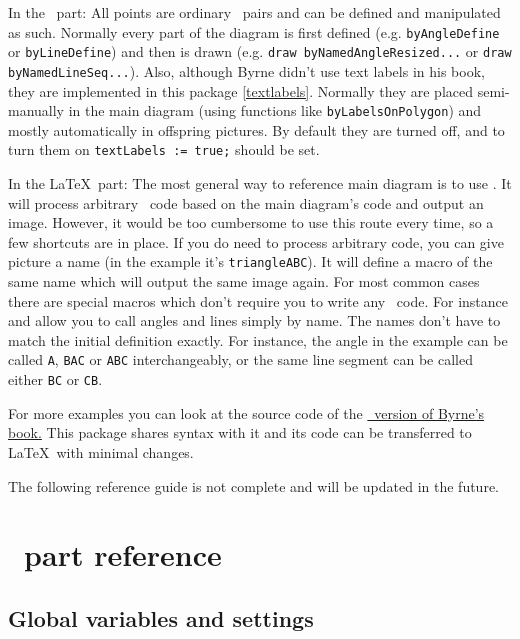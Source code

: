 In the \METAPOST\ part: 
All points are ordinary \METAPOST\ pairs and can be defined and manipulated as such. Normally every part of the diagram is first defined (e.g. \texttt{byAngleDefine} or \texttt{byLineDefine}) and then is drawn (e.g. \texttt{draw byNamedAngleResized...} or \texttt{draw byNamedLineSeq...}). Also, although Byrne didn't use text labels in his book, they are implemented in this package \ref{textlabels}. Normally they are placed semi-manually in the main diagram (using functions like \texttt{byLabelsOnPolygon}) and mostly automatically in offspring pictures. By default they are turned off, and to turn them on \texttt{textLabels := true;} should be set.

In the \LaTeX\ part: 
The most general way to reference main diagram is to use . It will process arbitrary \METAPOST\ code based on the main diagram's code and output an image. However, it would be too cumbersome to use this route every time, so a few shortcuts are in place. If you do need to process arbitrary code, you can give picture a name (in the example it's \texttt{triangleABC}). It will define a macro of the same name  which will output the same image again. For most common cases there are special macros which don't require you to write any \METAPOST\ code. For instance  and  allow you to call angles and lines simply by name. The names don't have to match the initial definition exactly. For instance, the angle in the example can be called \texttt{A}, \texttt{BAC} or \texttt{ABC} interchangeably, or the same line segment can be called either \texttt{BC} or \texttt{CB}.

For more examples you can look at the source code of the \href{https://github.com/jemmybutton/byrne-euclid/}{\ConTeXt\ version of Byrne's book.} This package shares syntax with it and its code can be transferred to \LaTeX\ with minimal changes.

The following reference guide is not complete and will be updated in the future.

\section{\METAPOST\ part reference}

\subsection{Global variables and settings}


